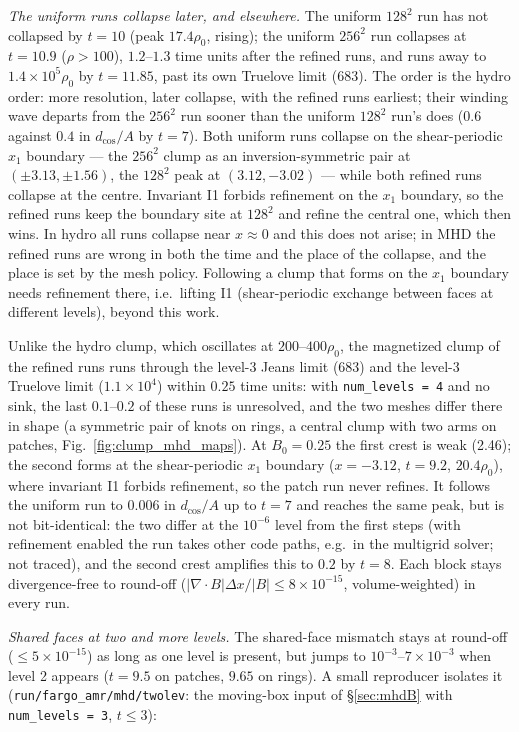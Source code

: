 \documentclass[11pt]{article}
\newcommand{\code}[1]{\texttt{#1}}
\newcommand{\file}[1]{\texttt{\small #1}}
\begin{document}
\emph{The uniform runs collapse later, and elsewhere.} The uniform $128^2$ run has not
collapsed by $t = 10$ (peak $17.4\rho_0$, rising); the uniform $256^2$ run collapses at
$t = 10.9$ ($\rho > 100$), $1.2$--$1.3$ time units after the refined runs, and runs away to
$1.4\times10^5\rho_0$ by $t = 11.85$, past its own Truelove limit (683). The order is the
hydro order: more resolution, later collapse, with the refined runs earliest; their winding
wave departs from the $256^2$ run sooner than the uniform $128^2$ run's does ($0.6$ against
$0.4$ in $d_{\cos}/A$ by $t = 7$). Both uniform runs collapse on the shear-periodic $x_1$
boundary --- the $256^2$ clump as an inversion-symmetric pair at $(\pm3.13, \pm1.56)$, the
$128^2$ peak at $(3.12, -3.02)$ --- while both refined runs collapse at the centre.
Invariant I1 forbids refinement on the $x_1$ boundary, so the refined runs keep the boundary
site at $128^2$ and refine the central one, which then wins. In hydro all runs collapse near
$x \approx 0$ and this does not arise; in MHD the refined runs are wrong in both the time and
the place of the collapse, and the place is set by the mesh policy. Following a clump that
forms on the $x_1$ boundary needs refinement there, i.e.\ lifting I1 (shear-periodic
exchange between faces at different levels), beyond this work.

Unlike the hydro
clump, which oscillates at $200$--$400\rho_0$, the magnetized clump of the refined runs runs
through the level-3 Jeans limit (683) and the level-3 Truelove limit ($1.1\times10^4$) within
$0.25$ time units: with \code{num\_levels = 4} and no sink, the last $0.1$--$0.2$ of these
runs is unresolved, and the two meshes differ there in shape (a symmetric pair of knots on
rings, a central clump with two arms on patches, Fig.~\ref{fig:clump_mhd_maps}). At
$B_0 = 0.25$ the first crest is weak (2.46); the second forms at the shear-periodic $x_1$
boundary ($x = -3.12$, $t = 9.2$, $20.4\rho_0$), where invariant I1 forbids refinement, so
the patch run never refines. It follows the uniform run to $0.006$ in $d_{\cos}/A$ up to
$t = 7$ and reaches the same peak, but is not bit-identical: the two differ at the
$10^{-6}$ level from the first steps (with refinement enabled the run takes other code
paths, e.g.\ in the multigrid solver; not traced), and the second crest amplifies this to
$0.2$ by $t = 8$. Each block stays
divergence-free to round-off ($|\nabla\!\cdot\!B|\Delta x/|B| \le 8\times10^{-15}$,
volume-weighted) in every run.

\emph{Shared faces at two and more levels.} The shared-face mismatch stays at round-off
($\le 5\times10^{-15}$) as long as one level is present, but jumps to
$10^{-3}$--$7\times10^{-3}$ when level 2 appears ($t = 9.5$ on patches, $9.65$ on rings).
A small reproducer isolates it (\file{run/fargo\_amr/mhd/twolev}: the moving-box input of
\S\ref{sec:mhdB} with \code{num\_levels = 3}, $t \le 3$):
\end{document}
